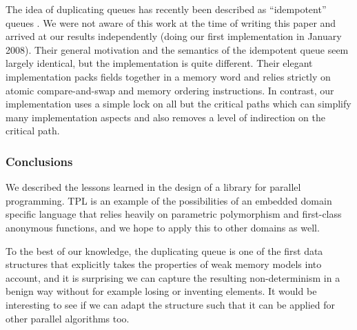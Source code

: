 The idea of duplicating queues has recently been described as
``idempotent'' queues \cite{Michael2009}. We were not aware of this
work at the time of writing this paper and arrived at our results
independently (doing our first implementation in January 2008). Their
general motivation and the semantics of the idempotent queue seem
largely identical, but the implementation is quite different. Their
elegant implementation packs fields together in a memory word and
relies strictly on atomic compare-and-swap and memory ordering
instructions. In contrast, our implementation uses a simple lock on
all but the critical paths which can simplify many implementation
aspects and also removes a level of indirection on the critical path.

\subsubsection{Conclusions}

We described the lessons learned in the design of a library for
parallel programming. TPL is an example of the possibilities of an
embedded domain specific language that relies heavily on parametric
polymorphism and first-class anonymous functions, and we hope to apply
this to other domains as well.

To the best of our knowledge, the duplicating queue is one of the
first data structures that explicitly takes the properties of weak
memory models into account, and it is surprising we can capture the
resulting non-determinism in a benign way without for example losing
or inventing elements. It would be interesting to see if we can adapt
the structure such that it can be applied for other parallel
algorithms too.









